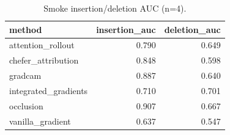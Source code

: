 \begin{table}
\caption{Smoke insertion/deletion AUC (n=4).}
\label{tab:xai-smoke}
\begin{tabular}{lrr}
\toprule
method & insertion_auc & deletion_auc \\
\midrule
attention_rollout & 0.790 & 0.649 \\
chefer_attribution & 0.848 & 0.598 \\
gradcam & 0.887 & 0.640 \\
integrated_gradients & 0.710 & 0.701 \\
occlusion & 0.907 & 0.667 \\
vanilla_gradient & 0.637 & 0.547 \\
\bottomrule
\end{tabular}
\end{table}
